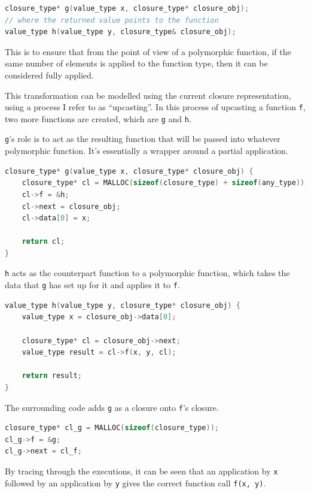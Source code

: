 \documentclass[12pt,a4paper,twoside,openright]{report}
\begin{document}
\begin{lstlisting}[language=C]
closure_type* g(value_type x, closure_type* closure_obj);
// where the returned value points to the function
value_type h(value_type y, closure_type& closure_obj);
\end{lstlisting}

This is to ensure that from the point of view of a polymorphic function, if the 
same number of elements is applied to the function type, then it can be 
considered fully applied.

This transformation can be modelled using the current closure representation,
using a process I refer to as ``upcasting''. In this process of upcasting a
function \texttt{f}, two more functions are created, which are \texttt{g} and
\texttt{h}.

\texttt{g}'s role is to act as the resulting function that will be passed into
whatever polymorphic function. It's essentially a wrapper around a partial
application.

\begin{lstlisting}[language=C]
closure_type* g(value_type x, closure_type* closure_obj) {
    closure_type* cl = MALLOC(sizeof(closure_type) + sizeof(any_type));
    cl->f = &h;
    cl->next = closure_obj;
    cl->data[0] = x;
    
    return cl;
}
\end{lstlisting}

\texttt{h} acts as the counterpart function to a polymorphic function, which 
takes the data that \texttt{g} has set up for it and applies it to \texttt{f}.

\begin{lstlisting}[language=C]
value_type h(value_type y, closure_type* closure_obj) {
    value_type x = closure_obj->data[0];
    
    closure_type* cl = closure_obj->next;
    value_type result = cl->f(x, y, cl);
    
    return result;
}
\end{lstlisting}

The surrounding code adds \texttt{g} as a closure onto \texttt{f}'s closure.

\begin{lstlisting}[language=C]
closure_type* cl_g = MALLOC(sizeof(closure_type));
cl_g->f = &g;
cl_g->next = cl_f;
\end{lstlisting}

By tracing through the executions, it can be seen that an application by 
\texttt{x} followed by an application by \texttt{y} gives the correct function 
call \texttt{f(x, y)}.
\end{document}
